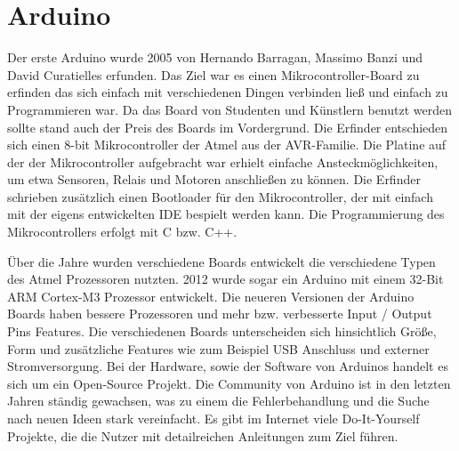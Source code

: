
\section{Arduino}
\label{sec:Arduino}
Der erste Arduino wurde 2005 von Hernando Barragan, Massimo Banzi und David Curatielles erfunden. Das Ziel war es einen Mikrocontroller-Board zu erfinden das sich einfach mit verschiedenen Dingen verbinden ließ und einfach zu Programmieren war. Da das Board von Studenten und Künstlern benutzt werden sollte stand auch der Preis des Boards im Vordergrund. Die Erfinder entschieden sich einen 8-bit Mikrocontroller der Atmel aus der AVR-Familie. Die Platine auf der der Mikrocontroller aufgebracht war erhielt einfache Ansteckmöglichkeiten, um etwa Sensoren, Relais und Motoren anschließen zu können. Die Erfinder schrieben zusätzlich einen Bootloader für den Mikrocontroller, der mit einfach mit der eigens entwickelten \ac{IDE} bespielt werden kann. Die Programmierung des Mikrocontrollers erfolgt mit C bzw. C++.

Über die Jahre wurden verschiedene Boards entwickelt die verschiedene Typen des Atmel Prozessoren nutzten. 2012 wurde sogar ein Arduino mit einem 32-Bit ARM Cortex-M3 Prozessor entwickelt. Die neueren Versionen der Arduino Boards haben bessere Prozessoren und mehr bzw. verbesserte Input / Output Pins Features. Die verschiedenen Boards unterscheiden sich hinsichtlich Größe, Form und zusätzliche Features wie zum Beispiel USB Anschluss und externer Stromversorgung.  Bei der Hardware, sowie der Software von Arduinos handelt es sich um ein Open-Source Projekt. Die Community von Arduino ist in den letzten Jahren ständig gewachsen, was zu einem die Fehlerbehandlung und die Suche nach neuen Ideen stark vereinfacht. Es gibt im Internet viele Do-It-Yourself Projekte, die die Nutzer mit detailreichen Anleitungen zum Ziel führen.

